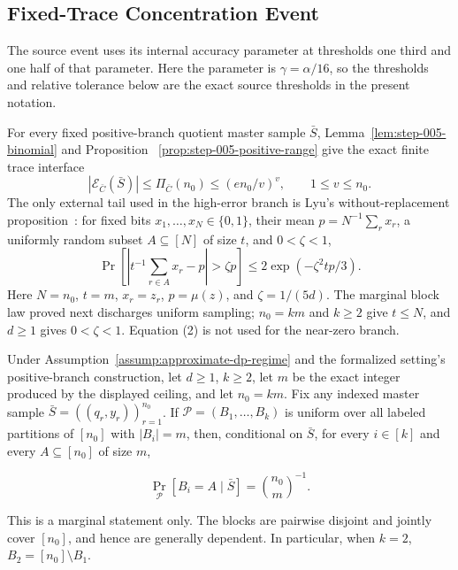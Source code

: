 \subsection{Fixed-Trace Concentration Event}\label{app:step_006}


The source event uses its internal accuracy parameter at thresholds one
third and one half of that parameter.  Here the parameter is
\(\gamma=\alpha/16\), so the thresholds and relative tolerance below are
the exact source thresholds in the present notation.

For every fixed positive-branch quotient master sample \(\bar S\),
Lemma~\ref{lem:step-005-binomial} and Proposition
~\ref{prop:step-005-positive-range} give the exact finite trace interface
\[
 |\mathcal E_{\bar C}(\bar S)|
 \leq\Pi_{\bar C}(n_0)
 \leq(en_0/v)^v,
 \qquad 1\leq v\leq n_0.
\tag{1}
\]
The only external tail used in the high-error branch is Lyu's
without-replacement proposition~\citep{lyu2025}: for fixed bits
\(x_1,\ldots,x_N\in\{0,1\}\), their mean
\(p=N^{-1}\sum_r x_r\), a uniformly random subset
\(A\subseteq[N]\) of size \(t\), and \(0<\zeta<1\),
\[
 \Pr\!\left[
 \left|t^{-1}\sum_{r\in A}x_r-p\right|>\zeta p
 \right]
 \leq2\exp(-\zeta^2tp/3).
\tag{2}
\]
Here \(N=n_0\), \(t=m\), \(x_r=z_r\),
\(p=\mu(z)\), and \(\zeta=1/(5d)\).  The marginal block law proved next
discharges uniform sampling; \(n_0=km\) and \(k\ge2\) give \(t\le N\),
and \(d\ge1\) gives \(0<\zeta<1\).  Equation (2) is not used for the
near-zero branch.



\begin{proposition}\label{prop:step-006-partition}
Under Assumption~\ref{assump:approximate-dp-regime} and the formalized
setting's positive-branch construction, let \(d\geq1\), \(k\geq2\), let
\(m\) be the exact integer produced by the displayed ceiling, and let
\(n_0=km\).  Fix any indexed master sample
\(\bar S=((q_r,y_r))_{r=1}^{n_0}\).  If
\(\mathcal P=(B_1,\ldots,B_k)\) is uniform over all labeled partitions of
\([n_0]\) with \(|B_i|=m\), then, conditional on \(\bar S\), for every
\(i\in[k]\) and every \(A\subseteq[n_0]\) of size \(m\),

\[
 \Pr_{\mathcal P}[B_i=A\mid\bar S]=\binom{n_0}{m}^{-1}.
\tag{3}
\]

This is a marginal statement only.  The blocks are pairwise disjoint and
jointly cover \([n_0]\), and hence are generally dependent.  In particular,
when \(k=2\), \(B_2=[n_0]\setminus B_1\).


\end{proposition}

